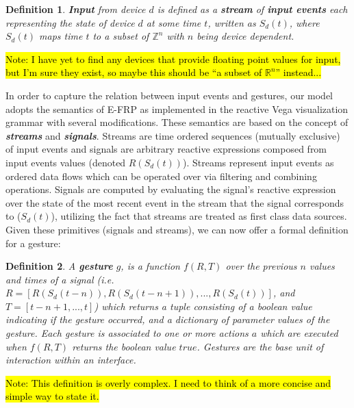 \documentclass{article}
\newcommand{\Z}{\mathbb{Z}}
\newcommand{\R}{\mathbb{R}}
\newtheorem{define}{Definition}
\begin{document}
\begin{define}
\textbf{Input} from device $d$ is defined as a \textbf{stream} of \textbf{input events} each representing the state of device $d$ at some time $t$, written as $S_d(t)$, where $S_d(t)$ maps time $t$ to a subset of $\Z^n$ with $n$ being device dependent.
\end{define}

\hl{Note: I have yet to find any devices that provide floating point values for input, but I'm sure they exist, so maybe this should be ``a subset of $\R^n$'' instead...}

In order to capture the relation between input events and gestures, our model adopts the semantics of E-FRP as implemented in the reactive Vega visualization grammar \cite{satyanarayan2014declarative} with several modifications.
These semantics are based on the concept of \textbf{\textit{streams}} and \textbf{\textit{signals}}. Streams are time ordered sequences (mutually exclusive) of input events and signals are arbitrary reactive expressions composed from input events values (denoted $R(S_d(t))$). Streams represent input events as ordered data flows which can be operated over via filtering and combining operations. Signals are computed by evaluating the signal's reactive expression over the state of the most recent event in the stream that the signal corresponds to ($S_d(t)$), utilizing the fact that streams are treated as first class data sources. Given these primitives (signals and streams), we can now offer a formal definition for a gesture:

\begin{define}
\label{def:gesture}
A \textbf{gesture} $g$, is a function $f(R, T)$ over the previous $n$ values and times of a signal (i.e. $R = [R(S_d(t-n)), R(S_d(t-n+1)), ..., R(S_d(t))]$, and $T = [t - n + 1, ... , t]$) which returns a tuple consisting of a boolean value indicating if the gesture occurred, and a dictionary of parameter values of the gesture.
Each gesture is associated to one or more actions $a$ which are executed when $f(R,T)$ returns the boolean value $true$. Gestures are the base unit of interaction within an interface.
\end{define}

\hl{Note: This definition is overly complex.
I need to think of a more concise and simple way to state it.}
\end{document}
